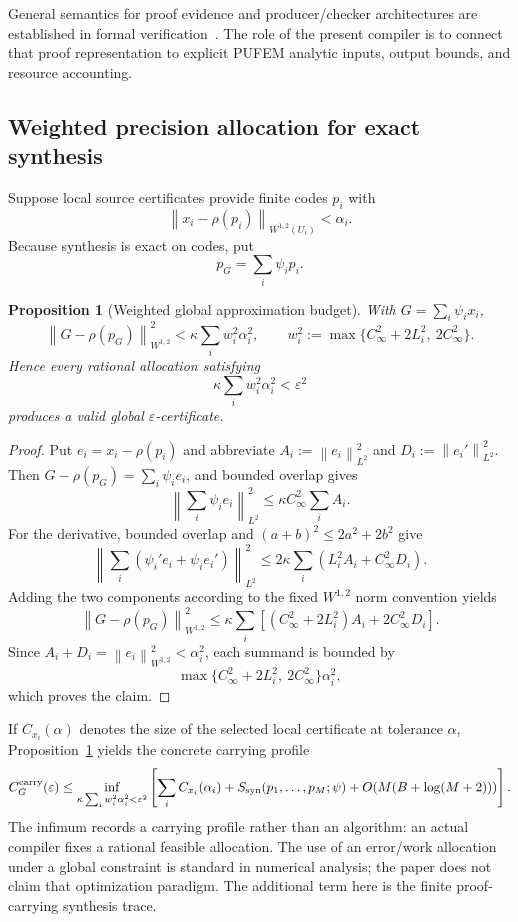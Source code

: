 \documentclass[11pt]{article}
\newtheorem{proposition}[theorem]{Proposition}
\theoremstyle{definition}
\newcommand{\norm}[1]{\left\lVert #1 \right\rVert}
\begin{document}
General semantics for proof evidence and producer/checker architectures are established in
formal verification~\cite{ChihaniMillerRenaud,Dandelion}.  The role of the present compiler
is to connect that proof representation to explicit PUFEM analytic inputs, output bounds,
and resource accounting.

\subsection{Weighted precision allocation for exact synthesis}

Suppose local source certificates provide finite codes $p_i$ with
\[
 \norm{x_i-\rho(p_i)}_{W^{1,2}(U_i)}<\alpha_i.
\]
Because synthesis is exact on codes, put
\[
 p_G=\sum_i\psi_i p_i.
\]

\begin{proposition}[Weighted global approximation budget]\label{prop:weightedbudget}
With $G=\sum_i\psi_i x_i$,
\[
 \norm{G-\rho(p_G)}_{W^{1,2}}^2
 <\kappa\sum_i w_i^2\alpha_i^2,
 \qquad
 w_i^2:=\max\bigl\{C_\infty^2+2L_i^2,\ 2C_\infty^2\bigr\}.
\]
Hence every rational allocation satisfying
\[
 \kappa\sum_iw_i^2\alpha_i^2<\varepsilon^2
\]
produces a valid global $\varepsilon$-certificate.
\end{proposition}

\begin{proof}
Put $e_i=x_i-\rho(p_i)$ and abbreviate
$A_i:=\norm{e_i}_{L^2}^2$ and $D_i:=\norm{e_i'}_{L^2}^2$.  Then
$G-\rho(p_G)=\sum_i\psi_i e_i$, and bounded overlap gives
\[
 \norm{\sum_i\psi_i e_i}_{L^2}^2
 \le\kappa C_\infty^2\sum_i A_i.
\]
For the derivative, bounded overlap and $(a+b)^2\le2a^2+2b^2$ give
\[
 \norm{\sum_i(\psi_i'e_i+\psi_ie_i')}_{L^2}^2
 \le2\kappa\sum_i
 \left(L_i^2 A_i+C_\infty^2D_i\right).
\]
Adding the two components according to the fixed $W^{1,2}$ norm convention yields
\[
 \norm{G-\rho(p_G)}_{W^{1,2}}^2
 \le\kappa\sum_i\left[(C_\infty^2+2L_i^2)A_i+2C_\infty^2D_i\right].
\]
Since $A_i+D_i=\norm{e_i}_{W^{1,2}}^2<\alpha_i^2$, each summand is bounded by
\[
 \max\bigl\{C_\infty^2+2L_i^2,\ 2C_\infty^2\bigr\}\alpha_i^2,
\]
which proves the claim.
\end{proof}

If $C_{x_i}(\alpha)$ denotes the size of the selected local certificate at tolerance
$\alpha$, Proposition~\ref{prop:weightedbudget} yields the concrete carrying profile
\[
 C_G^{\rm carry}(\varepsilon)
 \le
 \inf_{\kappa\sum_iw_i^2\alpha_i^2<\varepsilon^2}
 \left[
   \sum_i C_{x_i}(\alpha_i)
   +S_{\rm syn}(p_1,\ldots,p_M;\psi)
   +O(M(B+\log(M+2)))
 \right].
\]
The infimum records a carrying profile rather than an algorithm: an actual compiler fixes
a rational feasible allocation.  The use of an error/work allocation under a global constraint is standard in numerical
analysis; the paper does not claim that optimization paradigm.  The additional term here
is the finite proof-carrying synthesis trace.
\end{document}
